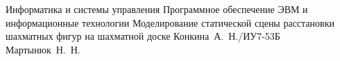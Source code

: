 \documentclass{bmstu}
\begin{document}
	\makecourseworktitle
	{Информатика и системы управления} 
	{Программное обеспечение ЭВМ и информационные технологии} 
	{Моделирование статической сцены расстановки шахматных фигур на шахматной доске} 
	{Конкина~А.~Н./ИУ7-53Б} 
	{Мартынюк~Н.~Н.} 
	{}
	
	\setcounter{page}{3}
	
	\maketableofcontents
	
	
	
	
	
	
	
	\makebibliography
	
	
	
\end{document}
